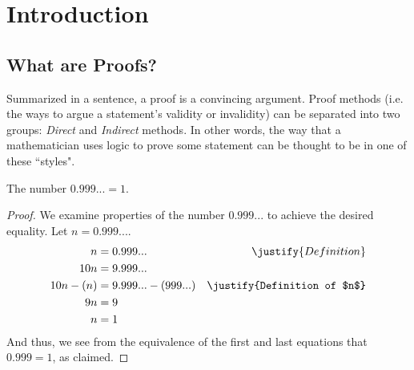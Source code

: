 \chapter{Introduction}
\section{What are Proofs?}
Summarized in a sentence, a proof is a convincing argument.
Proof methods (i.e. the ways to argue a statement's validity or invalidity) can be separated into two groups: \emph{Direct} and \emph{Indirect} methods. In other words, the way that a mathematician uses logic to prove some statement can be thought to be in one of these ``styles".

The number $0.999... = 1$.
\begin{proof}
  We examine properties of the number $0.999...$ to achieve the desired
  equality. Let $n = 0.999...$.
  \begin{align}
     n  &= 0.999... & \justify{Definition}  \\
     10n &= 9.999... 												\\
     10n - (n) &= 9.999... - (999...) & \justify{Definition of $n$} \\
     9n &= 9 \\
      n &= 1
  \end{align}
  And thus, we see from the equivalence of the first and last equations that $0.999 = 1$, as claimed.
\end{proof}
